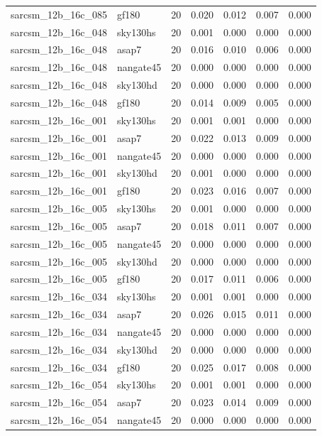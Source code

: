 \begin{tabular}{llrrrrr}
sarcsm\_12b\_16c\_085 & gf180 & 20 & 0.020 & 0.012 & 0.007 & 0.000 \\
sarcsm\_12b\_16c\_048 & sky130hs & 20 & 0.001 & 0.000 & 0.000 & 0.000 \\
sarcsm\_12b\_16c\_048 & asap7 & 20 & 0.016 & 0.010 & 0.006 & 0.000 \\
sarcsm\_12b\_16c\_048 & nangate45 & 20 & 0.000 & 0.000 & 0.000 & 0.000 \\
sarcsm\_12b\_16c\_048 & sky130hd & 20 & 0.000 & 0.000 & 0.000 & 0.000 \\
sarcsm\_12b\_16c\_048 & gf180 & 20 & 0.014 & 0.009 & 0.005 & 0.000 \\
sarcsm\_12b\_16c\_001 & sky130hs & 20 & 0.001 & 0.001 & 0.000 & 0.000 \\
sarcsm\_12b\_16c\_001 & asap7 & 20 & 0.022 & 0.013 & 0.009 & 0.000 \\
sarcsm\_12b\_16c\_001 & nangate45 & 20 & 0.000 & 0.000 & 0.000 & 0.000 \\
sarcsm\_12b\_16c\_001 & sky130hd & 20 & 0.001 & 0.000 & 0.000 & 0.000 \\
sarcsm\_12b\_16c\_001 & gf180 & 20 & 0.023 & 0.016 & 0.007 & 0.000 \\
sarcsm\_12b\_16c\_005 & sky130hs & 20 & 0.001 & 0.000 & 0.000 & 0.000 \\
sarcsm\_12b\_16c\_005 & asap7 & 20 & 0.018 & 0.011 & 0.007 & 0.000 \\
sarcsm\_12b\_16c\_005 & nangate45 & 20 & 0.000 & 0.000 & 0.000 & 0.000 \\
sarcsm\_12b\_16c\_005 & sky130hd & 20 & 0.000 & 0.000 & 0.000 & 0.000 \\
sarcsm\_12b\_16c\_005 & gf180 & 20 & 0.017 & 0.011 & 0.006 & 0.000 \\
sarcsm\_12b\_16c\_034 & sky130hs & 20 & 0.001 & 0.001 & 0.000 & 0.000 \\
sarcsm\_12b\_16c\_034 & asap7 & 20 & 0.026 & 0.015 & 0.011 & 0.000 \\
sarcsm\_12b\_16c\_034 & nangate45 & 20 & 0.000 & 0.000 & 0.000 & 0.000 \\
sarcsm\_12b\_16c\_034 & sky130hd & 20 & 0.000 & 0.000 & 0.000 & 0.000 \\
sarcsm\_12b\_16c\_034 & gf180 & 20 & 0.025 & 0.017 & 0.008 & 0.000 \\
sarcsm\_12b\_16c\_054 & sky130hs & 20 & 0.001 & 0.001 & 0.000 & 0.000 \\
sarcsm\_12b\_16c\_054 & asap7 & 20 & 0.023 & 0.014 & 0.009 & 0.000 \\
sarcsm\_12b\_16c\_054 & nangate45 & 20 & 0.000 & 0.000 & 0.000 & 0.000 \\

\end{tabular}
